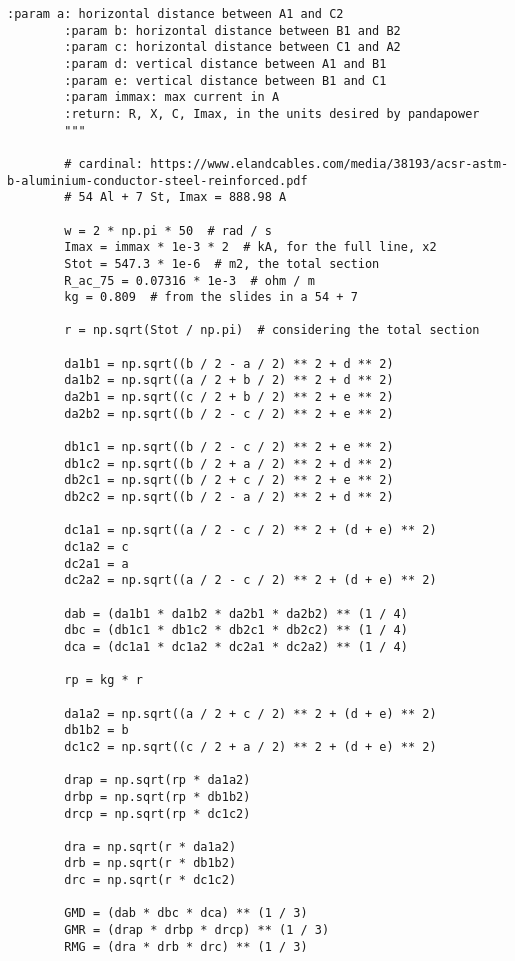 \begin{lstlisting}[caption={Code for the calculation of lines}]
        :param a: horizontal distance between A1 and C2
        :param b: horizontal distance between B1 and B2
        :param c: horizontal distance between C1 and A2
        :param d: vertical distance between A1 and B1
        :param e: vertical distance between B1 and C1
        :param immax: max current in A
        :return: R, X, C, Imax, in the units desired by pandapower
        """

        # cardinal: https://www.elandcables.com/media/38193/acsr-astm-b-aluminium-conductor-steel-reinforced.pdf
        # 54 Al + 7 St, Imax = 888.98 A

        w = 2 * np.pi * 50  # rad / s
        Imax = immax * 1e-3 * 2  # kA, for the full line, x2
        Stot = 547.3 * 1e-6  # m2, the total section
        R_ac_75 = 0.07316 * 1e-3  # ohm / m
        kg = 0.809  # from the slides in a 54 + 7

        r = np.sqrt(Stot / np.pi)  # considering the total section

        da1b1 = np.sqrt((b / 2 - a / 2) ** 2 + d ** 2)
        da1b2 = np.sqrt((a / 2 + b / 2) ** 2 + d ** 2)
        da2b1 = np.sqrt((c / 2 + b / 2) ** 2 + e ** 2)
        da2b2 = np.sqrt((b / 2 - c / 2) ** 2 + e ** 2)

        db1c1 = np.sqrt((b / 2 - c / 2) ** 2 + e ** 2)
        db1c2 = np.sqrt((b / 2 + a / 2) ** 2 + d ** 2)
        db2c1 = np.sqrt((b / 2 + c / 2) ** 2 + e ** 2)
        db2c2 = np.sqrt((b / 2 - a / 2) ** 2 + d ** 2)

        dc1a1 = np.sqrt((a / 2 - c / 2) ** 2 + (d + e) ** 2)
        dc1a2 = c
        dc2a1 = a
        dc2a2 = np.sqrt((a / 2 - c / 2) ** 2 + (d + e) ** 2)

        dab = (da1b1 * da1b2 * da2b1 * da2b2) ** (1 / 4)
        dbc = (db1c1 * db1c2 * db2c1 * db2c2) ** (1 / 4)
        dca = (dc1a1 * dc1a2 * dc2a1 * dc2a2) ** (1 / 4)

        rp = kg * r

        da1a2 = np.sqrt((a / 2 + c / 2) ** 2 + (d + e) ** 2)
        db1b2 = b
        dc1c2 = np.sqrt((c / 2 + a / 2) ** 2 + (d + e) ** 2)

        drap = np.sqrt(rp * da1a2)
        drbp = np.sqrt(rp * db1b2)
        drcp = np.sqrt(rp * dc1c2)

        dra = np.sqrt(r * da1a2)
        drb = np.sqrt(r * db1b2)
        drc = np.sqrt(r * dc1c2)

        GMD = (dab * dbc * dca) ** (1 / 3)
        GMR = (drap * drbp * drcp) ** (1 / 3)
        RMG = (dra * drb * drc) ** (1 / 3)


\end{lstlisting}
